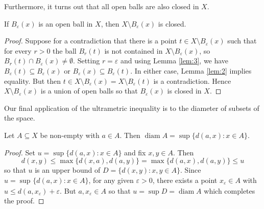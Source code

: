 \begin{comment}
Since \( A \cap B \neq \emptyset \) there is a point \( a \in A \cap B \). Write \( B = B_{\varepsilon } (x) \) for some \( x \in X \) and \( \varepsilon > 0 \). To show that \( A \cap B \) is a ball in \( A \), we must find a radius \( r > 0 \) such that for every \( t \in A \cap B\), \( d(a,t) < r \). Set \( r = \varepsilon  \) and fix \( t \in A \cap B \). Then \( a, t \in B \) so that \( d(a,x) < \varepsilon  \) and \( d(t,x) < \varepsilon  \). Using the strong triangle inequality, \[ d(a,t) \leq \max \{ d(a,x) , d(t,x) \} < \varepsilon = r. \] Therefore, \( A \cap B \) is a ball in \( A \).
\end{comment}

Furthermore, it turns out that all open balls are also closed in \( X \).
\begin{lemma}
\label{lem:5}
If \( B_{\varepsilon } (x) \) is an open ball in \( X \), then \( X \setminus  B_{\varepsilon } (x) \) is closed.
\end{lemma}
\begin{proof}
	Suppose for a contradiction that there is a point \( t \in X \setminus B_{\varepsilon} (x) \) such that for every \( r > 0 \) the ball \( B_{r}(t) \) is not contained in \( X \setminus B_{\varepsilon } (x) \), so \( B_{r} (t) \cap B_{\varepsilon} (x) \neq \emptyset \). Setting \( r = \varepsilon  \) and using Lemma \ref{lem:3}, we have \( B_{\varepsilon} (t) \subseteq B_{\varepsilon } (x) \) or \( B_{\varepsilon} (x) \subseteq B_{\varepsilon} (t) \). In either case, Lemma \ref{lem:2} implies equality. But then \( t \in X \setminus B_{\varepsilon } (x) = X \setminus B_{\varepsilon } (t) \) is a contradiction. Hence \( X \setminus B_{\varepsilon } (x) \) is a union of open balls so that \( B_{\varepsilon } (x) \) is closed in \( X \).
\end{proof}
Our final application of the ultrametric inequality is to the diameter of subsets of the space.
\begin{lemma}
\label{lem:6}
Let \( A \subseteq X \) be non-empty with \( a \in A \). Then \( \operatorname{diam} A = \sup \{ d(a, x) : x \in A \}   \).
\end{lemma}
\begin{proof}
	Set \( u = \sup \{ d(a,x) : x \in A \}  \) and fix \( x,y \in A \). Then \[ d(x,y) \leq \max \{ d(x, a) , d(a, y) \} = \max \{ d(a,x), d(a,y) \} \leq u  \] so that \( u \) is an upper bound of \( D = \{ d(x,y) : x,y \in A \}  \). Since \( u = \sup_{} \{ d(a,x) : x \in A \}  \), for any given \( \varepsilon > 0 \), there exists a point \( x_{\varepsilon } \in A \) with \( u \leq d(a, x_{\varepsilon }) + \varepsilon   \). But \( a, x_{\varepsilon } \in A \) so that \( u = \sup D = \operatorname{diam} A \) which completes the proof.
\end{proof}
